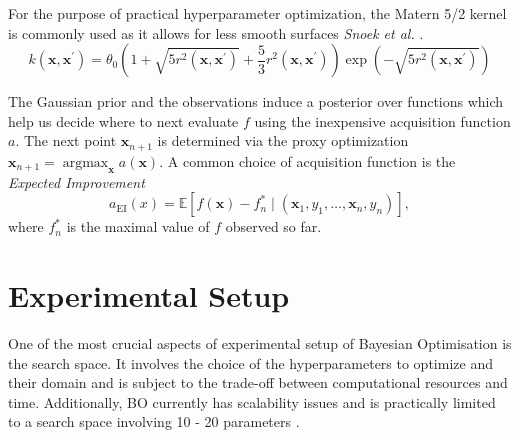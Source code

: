 \documentclass[bsc,frontabs,twoside,singlespacing,parskip,deptreport]{infthesis}     %
\let\Oldsection\section
\renewcommand{\section}{\FloatBarrier\Oldsection}
\begin{document}
For the purpose of practical hyperparameter optimization, the Matern 5/2 kernel is commonly used as it  allows for less smooth surfaces \textit{Snoek et al.} \cite{snoek_practical_nodate}.
\[k\left(\mathbf{x}, \mathbf{x}^{\prime}\right)=\theta_{0}\left(1+\sqrt{5 r^{2}\left(\mathbf{x}, \mathbf{x}^{\prime}\right)}+\frac{5}{3} r^{2}\left(\mathbf{x}, \mathbf{x}^{\prime}\right)\right) \exp \left(-\sqrt{5 r^{2}\left(\mathbf{x}, \mathbf{x}^{\prime}\right)}\right)\]

The Gaussian prior and the observations induce a posterior over functions which help us decide where to next evaluate \(f\) using the inexpensive acquisition function \(a\). The next point \(\mathbf{x}_{n+1}\) is determined via the proxy optimization  \(\mathbf{x}_{n+1}=\operatorname{argmax}_{\mathbf{x}} a(\mathbf{x})\).
A common choice of acquisition function is the \textit{Expected Improvement}
\[
a_{\mathrm{EI}}(x)=\mathbb{E}[f(\mathbf{x})-f_{n}^{*} \mid\left(\mathbf{x}_{1}, y_{1}, \ldots, \mathbf{x}_{n}, y_{n}\right)],
\] where \(f_{n}^{*}\) is the maximal value of \(f\) observed so far.
\section{Experimental Setup}
One of the most crucial aspects of experimental setup of Bayesian Optimisation is the search space. It involves the choice of the hyperparameters to optimize and their domain and is subject to the trade-off between computational resources and time. Additionally, BO currently has scalability issues and is practically limited to a search space involving 10 - 20 parameters \cite{moriconi_high-dimensional_2020}.
\end{document}
